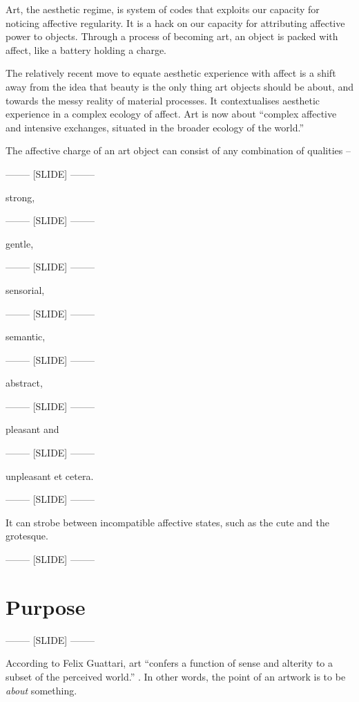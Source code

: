 \documentclass[letter:wpaper]{article}
\begin{document}
    Art, the aesthetic regime, is system of codes that exploits our capacity for noticing affective regularity. It is a hack on our capacity for attributing affective power to objects. Through a process of becoming art, an object is packed with affect, like a battery holding a charge. 
    
    The relatively recent move to equate aesthetic experience with affect is a shift away from the idea that beauty is the only thing art objects should be about, and towards the messy reality of material processes. It contextualises aesthetic experience in a complex ecology of affect. Art is now about ``complex affective and intensive exchanges, situated in the broader ecology of the world.'' \citep[p.155]{HighmoreBttrAftrTst2010}

    The affective charge of an art object can consist of any combination of qualities –

-------- [SLIDE] --------

    strong,

-------- [SLIDE] --------

    gentle,

-------- [SLIDE] --------

    sensorial,

-------- [SLIDE] --------

    semantic,

-------- [SLIDE] --------

    abstract,

-------- [SLIDE] --------

    pleasant and

-------- [SLIDE] --------

    unpleasant et cetera.

-------- [SLIDE] --------

    It can strobe between incompatible affective states, such as the cute and the grotesque.

-------- [SLIDE] --------

\section{Purpose}

-------- [SLIDE] --------

    According to Felix Guattari, art ``confers a function of sense and alterity to a subset of the perceived world.'' \citep[p.131]{GuattariChsmss1995}. In other words, the point of an artwork is to be \emph{about} something.
    
\end{document}
